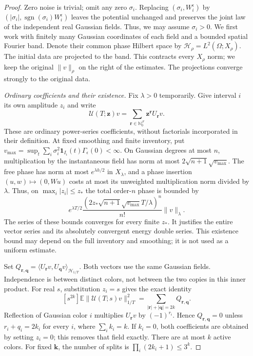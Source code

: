 \documentclass[12pt]{article}
\numberwithin{equation}{section}
\theoremstyle{definition}
\newcommand{\N}{\mathbb{N}}
\newcommand{\E}{\mathbb{E}}
\begin{document}
\begin{proof}
  Zero noise is trivial; omit any zero $\sigma_i$.
  Replacing $(\sigma_i,W_i^\epsilon)$ by
  $(|\sigma_i|,\operatorname{sgn}(\sigma_i)W_i^\epsilon)$ leaves the
  potential unchanged and preserves the joint law of the independent
  real Gaussian fields. Thus, we may assume $\sigma_i>0$.
  We first work with finitely many Gaussian coordinates of each field and
  a bounded spatial Fourier band. Denote their common phase Hilbert space
  by $\mathcal H_\rho=L^2(\Omega;X_\rho)$.
  The initial data are projected to the band. This contracts every
  $X_\rho$ norm; we keep the original $\|v\|_\rho$ on the right of
  the estimates. The projections converge strongly to the original data.

  \emph{Ordinary coefficients and their existence.}
  Fix $\lambda>0$ temporarily. Give interval $i$ its own amplitude
  $z_i$ and write
  \[
    \mathcal U(T;\boldsymbol z)v
    =\sum_{\boldsymbol r\in\N_0^{\mathcal F}}
    \boldsymbol z^{\boldsymbol r}U_{\boldsymbol r}v.
  \]
  These are ordinary power-series coefficients, without factorials
  incorporated in their definition. At fixed smoothing and finite inventory,
  put $v_{\max}=\sup_t\sum_i\sigma_i^2\mathbf1_{I_i}(t)
  \Gamma_\epsilon(0)<\infty$.
  On Gaussian degrees at most $n$, multiplication by the instantaneous
  field has norm at most $2\sqrt{n+1}\sqrt{v_{\max}}$.
  The free phase has norm at most $e^{\lambda h/2}$ in $X_\lambda$,
  and a phase insertion $(u,w)\mapsto(0,Wu)$ costs at most its
  unweighted multiplication norm divided by $\lambda$.
  Thus, on $\max_i|z_i|\le z_*$ the total order-$n$ phase is bounded by
  \begin{equation}\label{E:interval-entire-majorant}
    e^{\lambda T/2}
    \frac{(2z_*\sqrt{n+1}\sqrt{v_{\max}}T/\lambda)^n}{n!}
    \|v\|_\lambda .
  \end{equation}
  The series of these bounds converges for every finite $z_*$.
  It justifies the entire vector series and its absolutely convergent
  energy double series. This existence bound may depend on the full
  inventory and smoothing; it is not used as a uniform estimate.

  Set
  $Q_{\boldsymbol r,\boldsymbol q}
  =\langle U_{\boldsymbol r}v,U_{\boldsymbol q}v
  \rangle_{\mathcal H_{1/T}}$.
  Both vectors use the same Gaussian fields. Independence is between
  distinct colors, not between the two copies in this inner product.
  For real $s$, substitution $z_i=s$ gives the exact identity
  \begin{equation}\label{E:interval-energy-splits}
    [s^{2k}]\E\|\mathcal U(T;s)v\|_{1/T}^2
    =\sum_{|\boldsymbol r|+|\boldsymbol q|=2k}
    Q_{\boldsymbol r,\boldsymbol q}.
  \end{equation}
  Reflection of Gaussian color $i$ multiplies $U_{\boldsymbol r}v$
  by $(-1)^{r_i}$. Hence $Q_{\boldsymbol r,\boldsymbol q}=0$ unless
  $r_i+q_i=2k_i$ for every $i$, where $\sum_i k_i=k$.
  If $k_i=0$, both coefficients are obtained by setting $z_i=0$;
  this removes that field exactly. There are at most $k$ active colors.
  For fixed $\boldsymbol k$, the number of splits is
  $\prod_i(2k_i+1)\le3^k$.


\end{proof}
\end{document}
